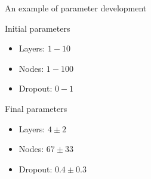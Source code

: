 \begin{frame}{An example of parameter development}
     \begin{block}{Initial parameters}
         \begin{itemize}
             \item Layers: $1-10$
             \item Nodes: $1-100$
             \item Dropout: $0-1$
         \end{itemize}
     \end{block}
     \begin{block}{Final parameters}
         \begin{itemize}
             \item Layers: $4\pm2$
             \item Nodes: $67\pm33$
             \item Dropout: $0.4\pm0.3$
         \end{itemize}
     \end{block}
\end{frame}


